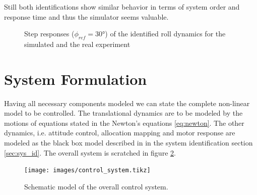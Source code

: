 Still both identifications show similar behavior in terms of system order and response time and thus the simulator seems valuable.
\begin{figure} 
\centering 
 
\caption{Step responses ($\phi_{ref} = 30 \si{\degree}$) of the identified roll dynamics for the simulated and the real experiment} 
\label{fig:sys_id_step_response} 
\end{figure}

\section{System Formulation}
Having all necessary components modeled we can state the complete non-linear model to be controlled. The translational dynamics are to be modeled by the motions of equations stated in the Newton's equations \ref{eq:newton}. The other dynamics, i.e. attitude control, allocation mapping and motor response are modeled as the black box model described in in the system identification section \ref{sec:sys_id}. The overall system is scratched in figure \ref{pics:control_system}.

\begin{figure}
\centering
\texttt{[image: images/control\_system.tikz]}
\caption{Schematic model of the overall control system.}
\label{pics:control_system}
\end{figure}

